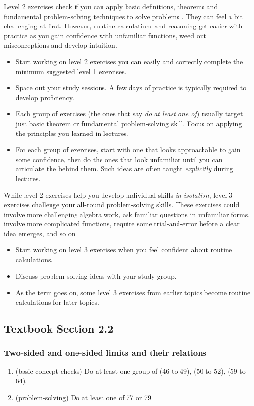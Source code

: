 \documentclass[../main.tex]{subfiles}
\begin{document}
Level 2 exercises check if you can apply basic definitions, theorems and fundamental problem-solving techniques to solve problems . They can feel a bit challenging at first. However, routine calculations and reasoning get easier with practice as you gain confidence with unfamiliar functions, weed out misconceptions and develop intuition.
\begin{itemize}
  \item Start working on level 2 exercises  you can easily and correctly complete the minimum suggested level 1 exercises.
  \item Space out your study sessions. A few days of practice is typically required to develop proficiency.
  \item Each group of exercises (the ones that say \emph{do at least one of}) usually target just  basic theorem or fundamental problem-solving skill. Focus on applying the principles you learned in lectures.
  \item For each group of exercises, start with one that looks approachable to gain some confidence, then do the ones that look unfamiliar until you can articulate the  behind them. Such ideas are often taught \emph{explicitly} during lectures.
\end{itemize}

While level 2 exercises help you develop individual skills \emph{in isolation}, level 3 exercises challenge your all-round problem-solving skills. These exercises could involve more challenging algebra work, ask familiar questions in unfamiliar forms, involve more complicated functions, require some trial-and-error before a clear idea emerges, and so on.
\begin{itemize}
  \item Start working on level 3 exercises when you feel confident about routine calculations.
  \item Discuss problem-solving ideas with your study group.
  \item As the term goes on, some level 3 exercises from earlier topics become routine calculations for later topics.
\end{itemize}
\clearpage

\subsection*{Textbook Section 2.2}
\subsubsection{Two-sided and one-sided limits and their relations}
\begin{enumerate}
  \item (basic concept checks) Do at least one group of (46 to 49), (50 to 52), (59 to 64).
  \item (problem-solving) Do at least one of 77 or 79.
\end{enumerate}
\end{document}
